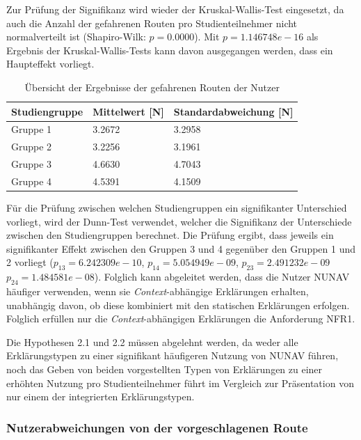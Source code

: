 Zur Prüfung der Signifikanz wird wieder der Kruskal-Wallis-Test eingesetzt, da auch die Anzahl der gefahrenen Routen pro Studienteilnehmer nicht normalverteilt ist (Shapiro-Wilk: $ p = 0.0000 $). Mit $ p = 1.146748e-16 $ als Ergebnis der Kruskal-Wallis-Tests kann davon ausgegangen werden, dass ein Haupteffekt vorliegt.

\begin{table}[htb!]
    \centering
    \begin{tabular}{p{}p{}p{}}
        \hline
        Studiengruppe  & Mittelwert [N] & Standardabweichung [N] \\
        \toprule
        Gruppe 1                & 3.2672 & 3.2958 \\
        Gruppe 2                & 3.2256 & 3.1961 \\
        Gruppe 3                & 4.6630 & 4.7043 \\
        Gruppe 4                & 4.5391 & 4.1509 \\
        \bottomrule
    \end{tabular}
    \caption{Übersicht der Ergebnisse der gefahrenen Routen der Nutzer}
    \label{tab:study_usage_results}
\end{table}

Für die Prüfung zwischen welchen Studiengruppen ein signifikanter Unterschied vorliegt, wird der Dunn-Test \cite{dunn1964multiple} verwendet, welcher die Signifikanz der Unterschiede zwischen den Studiengruppen berechnet. Die Prüfung ergibt, dass jeweils ein signifikanter Effekt zwischen den Gruppen 3 und 4 gegenüber den Gruppen 1 und 2 vorliegt ($ p_{13} = 6.242309e-10 $, $ p_{14} = 5.054949e-09 $, $ p_{23} = 2.491232e-09 $ $ p_{24} = 1.484581e-08 $). Folglich kann abgeleitet werden, dass die Nutzer NUNAV häufiger verwenden, wenn sie \textit{Context}-abhängige Erklärungen erhalten, unabhängig davon, ob diese kombiniert mit den statischen Erklärungen erfolgen. Folglich erfüllen nur die \textit{Context}-abhängigen Erklärungen die Anforderung NFR1.

Die Hypothesen 2.1 und 2.2 müssen abgelehnt werden, da weder alle Erklärungstypen zu einer signifikant häufigeren Nutzung von NUNAV führen, noch das Geben von beiden vorgestellten Typen von Erklärungen zu einer erhöhten Nutzung pro Studienteilnehmer führt im Vergleich zur Präsentation von nur einem der integrierten Erklärungstypen. 

\subsubsection{Nutzerabweichungen von der vorgeschlagenen Route}

